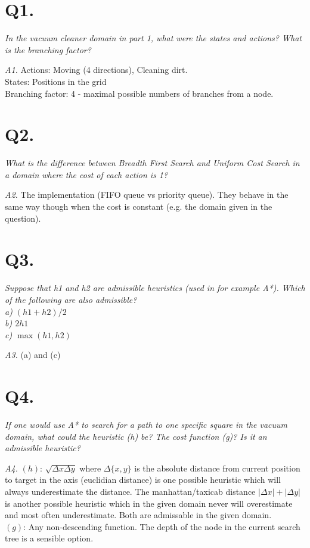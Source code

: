 \clearpage
\setcounter{page}{1}
\section{Q1.}
\em In the vacuum cleaner domain in part 1, what were the states and actions? What is the branching factor?\em

\emph{A1.} Actions: Moving (4 directions), Cleaning dirt.\\
    States: Positions in the grid\\
    Branching factor: 4 - maximal possible numbers of branches from a node.\\

\section{Q2.}
\em What is the difference between Breadth First Search and Uniform Cost Search in a domain where the cost
    of each action is 1?\em

\emph{A2.} The implementation (FIFO queue vs priority queue). They behave in the same way though when the cost
    is constant (e.g. the domain given in the question).

\section{Q3.}
\em Suppose that h1 and h2 are admissible heuristics (used in for example A*). Which of the following are
    also admissible?\\
    a) $(h1+h2)/2$\\
    b) $2h1$\\
    c) $\max(h1,h2)$\em

\emph{A3.} (a) and (c)

\section{Q4.}
\em If one would use A* to search for a path to one specific square in the vacuum domain, what could the
    heuristic (h) be? The cost function (g)? Is it an admissible heuristic?\em

\emph{A4.}
    $(h)$: $\sqrt{\Delta{}x\Delta{}y}$ where $\Delta{}\{x,y\}$ is the absolute distance from current
    position to target in the axis (euclidian distance) is one possible heuristic which will always
    underestimate the distance. The manhattan/taxicab distance $|\Delta x| + |\Delta y|$ is another
    possible heuristic which in the given domain never will overestimate and most often underestimate.
    Both are admissable in the given domain.\\
    $(g)$: Any non-descending function. The depth of the node in the current search tree is a sensible option.


